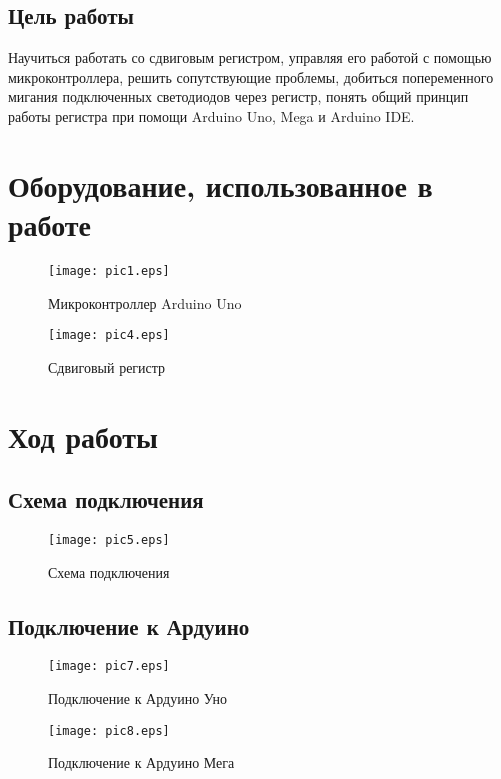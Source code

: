 \documentclass[12pt,a4paper]{scrartcl}
\begin{document}
\subsection{Цель работы}
Научиться работать со сдвиговым регистром, управляя его работой с помощью микроконтроллера, решить сопутствующие проблемы, добиться попеременного мигания подключенных светодиодов через регистр, понять общий принцип работы регистра при помощи Arduino Uno, Mega и Arduino IDE.

 	\newpage
 
\section{Оборудование, использованное в работе}
\begin{figure}[h!]  
	\centering
	\texttt{[image: pic1.eps]} %
	\caption{Микроконтроллер Arduino Uno} 
	\label{image:pic1} %
\end{figure}	
\begin{figure}[h!]  
	\centering
	\texttt{[image: pic4.eps]} %
	\caption{Сдвиговый регистр} 
	\label{image:pic4} %
\end{figure}
  \newpage
  \section{Ход работы}
  \subsection{Схема подключения}
  \begin{figure}[h!]  
  	\centering
  	\texttt{[image: pic5.eps]} %
  	\caption{Схема подключения} 
  	\label{image:pic5}
  \end{figure}
   
\subsection{Подключение к Ардуино}
  \begin{figure}[h!]  
	\centering
	\texttt{[image: pic7.eps]} %
	\caption{Подключение к Ардуино Уно} 
	\label{image:pic7}
\end{figure}

  \begin{figure}[h!]  
	\centering
	\texttt{[image: pic8.eps]} %
	\caption{Подключение к Ардуино Мега} 
	\label{image:pic8}
\end{figure}
  \newpage
\end{document}
